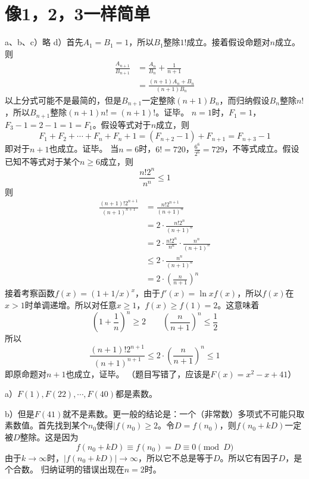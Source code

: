 \chapter{像1，2，3一样简单}
%
\exercise a、b、c）略
d）首先$A_1=B_1=1$，所以$B_1$整除$1!$成立。接着假设命题对$n$成立。则
\begin{align*}
\frac{A_{n+1}}{B_{n+1}}&=\frac{A_n}{B_n}+\frac{1}{n+1}\\
&=\frac{(n+1)A_n+B_n}{(n+1)B_n}
\end{align*}
以上分式可能不是最简的，但是$B_{n+1}$一定整除$(n+1)B_n$，而归纳假设$B_n$整除$n!$，所以$B_{n+1}$整除$(n+1)n!=(n+1)!$。证毕。
%
\exercise $n=1$时，$F_1=1$，$F_3-1=2-1=1=F_1$。假设等式对于$n$成立，则
\[F_1+F_2+\cdots+F_n+F_n+1=(F_{n+2}-1)+F_{n+1}=F_{n+3}-1\]
即对于$n+1$也成立。证毕。
%
\exercise 当$n=6$时，$6!=720$，$\frac{6^6}{2^6}=729$，不等式成立。假设已知不等式对于某个$n\ge6$成立，则
\[\frac{n!2^n}{n^n}\le 1\]
则
\begin{align*}
\frac{(n+1)!2^{n+1}}{(n+1)^{n+1}}&=\frac{n!2^{n+1}}{(n+1)^n} \\
&=2\cdot\frac{n!2^{n}}{(n+1)^n} \\
&=2\cdot\frac{n!2^{n}}{n^n}\cdot\frac{n^n}{(n+1)^n} \\
&\le 2\cdot\frac{n^n}{(n+1)^n} \\
&=2\cdot \left(\frac{n}{n+1}\right)^n
\end{align*}
接着考察函数$f(x)=(1+1/x)^x$，由于$f'(x)=\ln xf(x)$，所以$f(x)$在$x>1$时单调递增。所以对任意$x\ge1$，$f(x)\ge f(1)=2$。这意味着
\[\left(1+\frac{1}{n}\right)^n\ge 2\qquad \left(\frac{n}{n+1}\right)^n\le \frac{1}{2}\]
所以
\[\frac{(n+1)!2^{n+1}}{(n+1)^{n+1}}\le2\cdot \left(\frac{n}{n+1}\right)^n\le1\]
即原命题对$n+1$也成立，证毕。
%
\exercise （题目写错了，应该是$F(x)=x^2-x+41$）\par
a）$F(1),F(22),\cdots,F(40)$都是素数。\par
b）但是$F(41)$就不是素数。更一般的结论是：一个（非常数）多项式不可能只取素数值。首先找到某个$n_0$使得$|f(n_0)\ge2$。令$D=f(n_0)$，则$f(n_0+kD)$一定被$D$整除。这是因为
\[f(n_0+kD)\equiv f(n_0)=D\equiv0\pmod D\]
由于$k\rightarrow \infty$时，$|f(n_0+kD)|\rightarrow \infty$，所以它不总是等于$D$。所以它有因子$D$，是个合数。
%
\exercise 归纳证明的错误出现在$n=2$时。